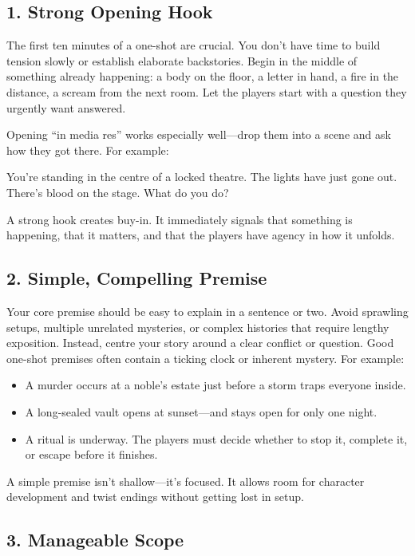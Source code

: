 \subsection*{1. Strong Opening Hook}

The first ten minutes of a one-shot are crucial. You don’t have time to build tension slowly or establish elaborate backstories. Begin in the middle of something already happening: a body on the floor, a letter in hand, a fire in the distance, a scream from the next room. Let the players start with a question they urgently want answered.

Opening “in media res” works especially well—drop them into a scene and ask how they got there. For example:
\begin{Example}{}
    You’re standing in the centre of a locked theatre. The lights have just gone out. There’s blood on the stage. What do you do?
\end{Example}

A strong hook creates buy-in. It immediately signals that something is happening, that it matters, and that the players have agency in how it unfolds.

\subsection*{2. Simple, Compelling Premise}

Your core premise should be easy to explain in a sentence or two. Avoid sprawling setups, multiple unrelated mysteries, or complex histories that require lengthy exposition. Instead, centre your story around a clear conflict or question. Good one-shot premises often contain a ticking clock or inherent mystery. For example:
\begin{itemize}
    \item A murder occurs at a noble’s estate just before a storm traps everyone inside.
    \item A long-sealed vault opens at sunset—and stays open for only one night.
    \item A ritual is underway. The players must decide whether to stop it, complete it, or escape before it finishes.
\end{itemize}

A simple premise isn’t shallow—it’s focused. It allows room for character development and twist endings without getting lost in setup.

\subsection*{3. Manageable Scope}

